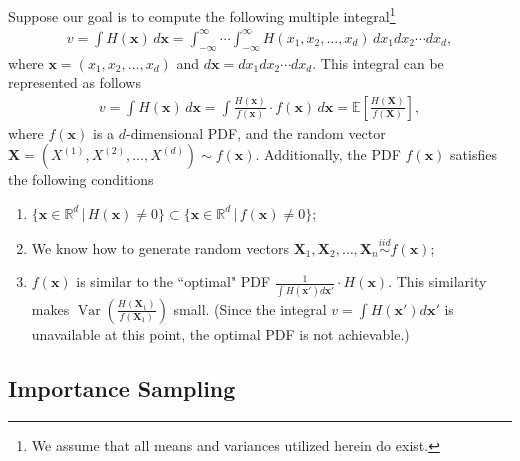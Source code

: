 \documentclass[11pt,letterpaper, leqno]{article}
\numberwithin{equation}{section}
\numberwithin{theorem}{section}
\numberwithin{lemma}{section}
\numberwithin{corollary}{section}
\numberwithin{definition}{section}
\numberwithin{proposition}{section}
\numberwithin{remark}{section}
\numberwithin{example}{section}
\begin{document}
Suppose our goal is to compute the following multiple integral\footnote{We assume that all means and variances utilized herein do exist.}
\begin{align*}
    v=\int H(\boldsymbol{x}) \,d\boldsymbol{x} = \int_{-\infty}^\infty \cdots \int_{-\infty}^\infty H(x_1, x_2, \ldots, x_d) \,dx_1 dx_2\cdots dx_d,
\end{align*}
where $\boldsymbol{x}=(x_1, x_2, \ldots, x_d)$ and $d\boldsymbol{x}=dx_1 dx_2 \cdots dx_d$. This integral can be represented as follows
\begin{align*}
    \boxed{v=\int H(\boldsymbol{x}) \,d\boldsymbol{x}= \int \frac{H(\boldsymbol{x})}{f(\boldsymbol{x})}\cdot f(\boldsymbol{x}) \,d\boldsymbol{x}=\mathbb{E}\left[\frac{H(\boldsymbol{X})}{f(\boldsymbol{X})}\right],}
\end{align*}
where $f(\boldsymbol{x})$ is a $d$-dimensional PDF, and the random vector $\boldsymbol{X}=(X^{(1)}, X^{(2)}, \ldots, X^{(d)})\sim f(\boldsymbol{x})$. Additionally, the PDF $f(\boldsymbol{x})$ satisfies the following conditions
\begin{enumerate}
    \item $\{\boldsymbol{x}\in\mathbb{R}^d\,\vert\, H(\boldsymbol{x})\ne 0\} \subset \{\boldsymbol{x}\in\mathbb{R}^d\,\vert\, f(\boldsymbol{x})\ne 0\}$;
    
    \item We know how to generate random vectors $\boldsymbol{X}_1, \boldsymbol{X}_2,\ldots, \boldsymbol{X}_n \overset{iid}{\sim} f(\boldsymbol{x})$;
    
    \item $f(\boldsymbol{x})$ is similar to the ``optimal" PDF $\frac{1}{\int H(\boldsymbol{x}') d\boldsymbol{x}'} \cdot H(\boldsymbol{x})$. This similarity makes $\operatorname{Var}\left(\frac{H(\boldsymbol{X}_1)}{f(\boldsymbol{X}_1)}\right)$ small. (Since the integral $v=\int H(\boldsymbol{x}') d\boldsymbol{x}'$ is unavailable at this point, the optimal PDF is not achievable.)
\end{enumerate}

\subsection{Importance Sampling}
\end{document}
